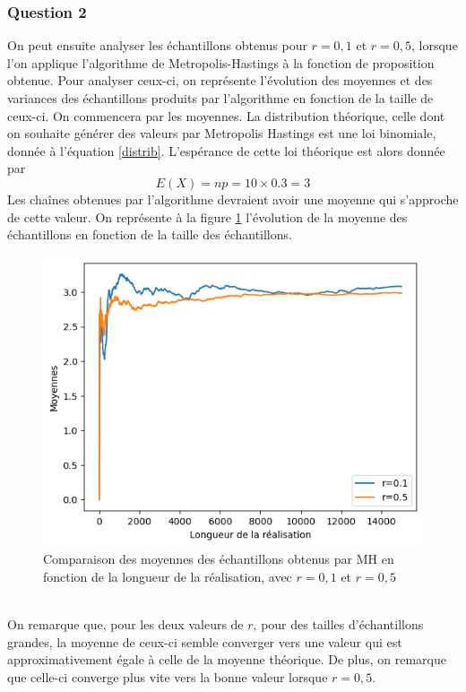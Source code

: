 \documentclass[a4paper, 11pt]{article}
\begin{document}
\newpage
\subsubsection{Question 2}\label{132}
On peut ensuite analyser les échantillons obtenus pour $r=0,1$ et $r=0,5$, lorsque l'on applique l'algorithme de Metropolis-Hastings à la fonction de proposition obtenue. Pour analyser ceux-ci, on représente l'évolution des moyennes et des variances des échantillons produits par l'algorithme en fonction de la taille de ceux-ci. On commencera par les moyennes. La distribution théorique, celle dont on souhaite générer des valeurs par Metropolis Hastings est une loi binomiale, donnée à l'équation \ref{distrib}. L'espérance de cette loi théorique est alors donnée par
\begin{equation}
    E(X)=np=10\times 0.3=3
\end{equation}
Les chaînes obtenues par l'algorithme devraient avoir une moyenne qui s'approche de cette valeur. On représente à la figure \ref{mean} l'évolution de la moyenne des échantillons en fonction de la taille des échantillons.

\begin{figure}[h!]
    \centering
    \includegraphics[scale=1]{mean.png}
    \caption{Comparaison des moyennes des échantillons obtenus par MH en fonction de la longueur de la réalisation, avec $r=0,1$ et $r=0,5$}
    \label{mean}
\end{figure}\\

On remarque que, pour les deux valeurs de $r$, pour des tailles d'échantillons grandes, la moyenne de ceux-ci semble converger vers une valeur qui est approximativement égale à celle de la moyenne théorique. De plus, on remarque que celle-ci converge plus vite vers la bonne valeur lorsque $r=0,5$.\\
\end{document}

